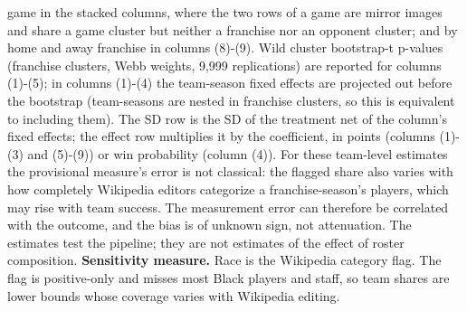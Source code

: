 \begin{table}[!h]
{\begin{threeparttable}
\begin{tablenotes}[para]
game in the stacked columns, where the two rows of a game are mirror images and share a game cluster but neither a franchise nor an opponent cluster; and by home and away franchise in columns (8)-(9). Wild cluster bootstrap-t p-values (franchise clusters, Webb weights, 9,999 replications) are  reported for columns (1)-(5); in columns (1)-(4) the team-season fixed effects are projected out before the bootstrap (team-seasons are nested in franchise clusters, so this is equivalent to including them). The SD row is the SD of the treatment net of the column's fixed effects; the effect row multiplies it by the coefficient, in points (columns (1)-(3) and (5)-(9)) or win probability (column (4)). For these team-level estimates the provisional measure's error is not classical: the flagged share also varies with how completely Wikipedia editors categorize a franchise-season's players, which may rise with team success. The measurement error can therefore be correlated with the outcome, and the bias is of unknown sign, not attenuation. The estimates test the pipeline; they are not estimates of the effect of roster composition. \textbf{Sensitivity measure.} Race is the Wikipedia category flag. The flag is positive-only and misses most Black players and staff, so team shares are lower bounds whose coverage varies with Wikipedia editing.
\end{tablenotes}
\end{threeparttable}}
\end{table}
